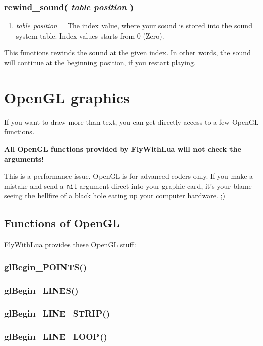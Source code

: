 \documentclass[11pt,parskip=half,a4paper]{scrartcl}
\begin{document}
\subsubsection{ rewind\_sound( \emph{table position} )}

\begin{enumerate}
	\item \emph{table position} = The index value, where your sound is stored into the sound system table. Index values starts from 0 (Zero).
\end{enumerate}

This functions rewinds the sound at the given index. In other words, the sound will continue at the beginning position, if you restart playing.


\newpage
\section{OpenGL graphics}

If you want to draw more than text, you can get directly access to a few OpenGL functions.

\textbf{All OpenGL functions provided by FlyWithLua will not check the arguments!}

This is a performance issue. OpenGL is for advanced coders only. If you make a mistake and send a \verb|nil| argument direct into your graphic card, it's your blame seeing the hellfire of a black hole eating up your computer hardware. ;)

\subsection{Functions of OpenGL}

FlyWithLua provides these OpenGL stuff:

\subsubsection{glBegin\_POINTS()}

\subsubsection{glBegin\_LINES()}

\subsubsection{glBegin\_LINE\_STRIP()}

\subsubsection{glBegin\_LINE\_LOOP()}
\end{document}
